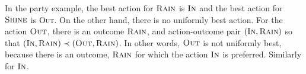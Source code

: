 In the party example, the best action for $\textsc{Rain}$ is $\textsc{In}$ and the best action for $\textsc{Shine}$ is \textsc{Out}.
On the other hand, there is no uniformly best action.
For the action $\textsc{Out}$, there is an outcome $\textsc{Rain}$, and action-outcome pair $(\textsc{In}, \textsc{Rain})$ so that $(\textsc{In}, \textsc{Rain}) \prec (\textsc{Out}, \textsc{Rain})$.
In other words, $\textsc{Out}$ is not uniformly best, because there is an outcome, $\textsc{Rain}$ for which the action $\textsc{In}$ is preferred.
Similarly for $\textsc{In}$.
